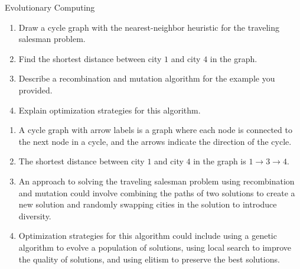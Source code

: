 \documentclass{article}
\begin{document}
\begin{exercise}{Evolutionary Computing}
  

  \begin{enumerate}
    \item Draw a cycle graph with the nearest-neighbor heuristic for the traveling salesman problem.
    \item Find the shortest distance between city $1$ and city $4$ in the graph.
    \item Describe a recombination and mutation algorithm for the example you provided.
    \item Explain optimization strategies for this algorithm.
  \end{enumerate}

  \begin{solution}
    \begin{enumerate}
      \item A cycle graph with arrow labels is a graph where each node is connected to the next node in a cycle, and the arrows indicate the direction of the cycle.
      \item The shortest distance between city $1$ and city $4$ in the graph is $1\to3\to4$.
      \item An approach to solving the traveling salesman problem using recombination and mutation could involve combining the paths of two solutions to create a new solution and randomly swapping cities in the solution to introduce diversity.
      \item Optimization strategies for this algorithm could include using a genetic algorithm to evolve a population of solutions, using local search to improve the quality of solutions, and using elitism to preserve the best solutions.
    \end{enumerate}
  \end{solution}
\end{exercise}



\end{document}
